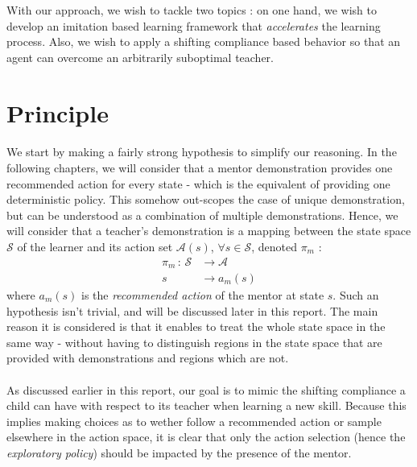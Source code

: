 \documentclass[a4paper]{report}
\begin{document}
	{
		 With our approach, we wish to tackle two topics : on one hand, we wish to develop an imitation based learning framework that \emph{accelerates} the learning process. Also, we wish to apply a shifting compliance based behavior so that an agent can overcome an arbitrarily suboptimal teacher.
		
		\section{Principle}
		{
			\paragraph{} We start by making a fairly strong hypothesis to simplify our reasoning. In the following chapters, we will consider that a mentor demonstration provides one recommended action for every state - which is the equivalent of providing one deterministic policy. This somehow out-scopes the case of unique demonstration, but can be understood as a combination of multiple demonstrations.\newline
			Hence, we will consider that a teacher's demonstration is a mapping between the state space $\mathcal{S}$ of the learner and its action set $\mathcal{A}(s)$, $\forall s\in\mathcal{S}$, denoted $\pi_m$ : 
			\begin{equation}
				\begin{aligned}
					\pi_m \, :  \, \mathcal{S} &\to \mathcal{A}\\
						     s &\to a_m(s) 
				\end{aligned}
			\end{equation}
			where $a_m(s)$ is the \emph{recommended action} of the mentor at state $s$. 
			\newline 
			Such an hypothesis isn't trivial, and will be discussed later in this report. The main reason it is considered is that it enables to treat the whole state space in the same way - without having to distinguish regions in the state space that are provided with demonstrations and regions which are not. 
			
			\paragraph{} As discussed earlier in this report, our goal is to mimic the shifting compliance a child can have with respect to its teacher when learning a new skill. Because this implies making choices as to wether follow a recommended action or sample elsewhere in the action space, it is clear that only the action selection (hence the \emph{exploratory policy}) should be impacted by the presence of the mentor. 

}}
\end{document}
